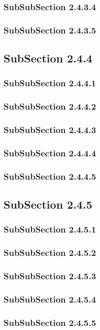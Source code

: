 \subsubsection{SubSubSection 2.4.3.4}
\subsubsection{SubSubSection 2.4.3.5}
\subsection{SubSection 2.4.4}
\subsubsection{SubSubSection 2.4.4.1}
\subsubsection{SubSubSection 2.4.4.2}
\subsubsection{SubSubSection 2.4.4.3}
\subsubsection{SubSubSection 2.4.4.4}
\subsubsection{SubSubSection 2.4.4.5}
\subsection{SubSection 2.4.5}
\subsubsection{SubSubSection 2.4.5.1}
\subsubsection{SubSubSection 2.4.5.2}
\subsubsection{SubSubSection 2.4.5.3}
\subsubsection{SubSubSection 2.4.5.4}
\subsubsection{SubSubSection 2.4.5.5}
